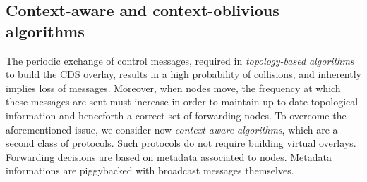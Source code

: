 \subsection{Context-aware and context-oblivious algorithms}

The periodic exchange of control messages, required in
\textit{topology-based algorithms} to build the CDS overlay,
results in a high probability of collisions, and inherently implies loss of messages.
%
Moreover, when nodes move, the frequency at which these messages are sent must increase in order to maintain up-to-date topological information and henceforth a correct set of forwarding nodes.
%
To overcome the aforementioned issue, we consider now
\textit{context-aware algorithms}, which are a second class of
protocols. Such protocols do not require building virtual overlays.
Forwarding decisions are based on metadata
associated to nodes. Metadata informations are piggybacked with broadcast messages themselves.


